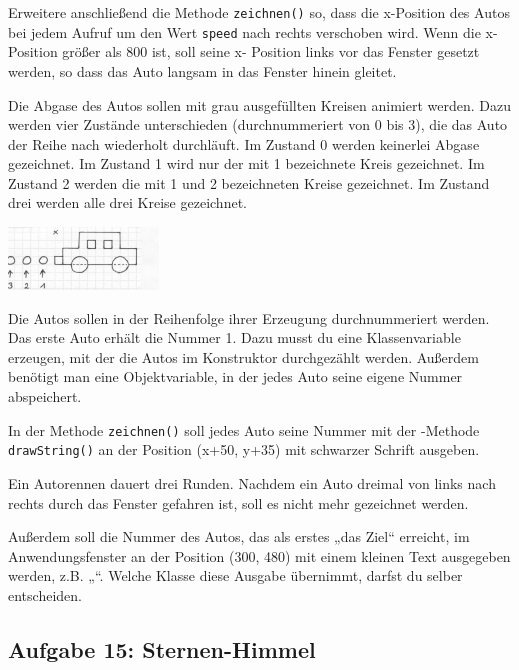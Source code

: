\begin{compactenum}[a)]
Erweitere anschließend die Methode \lstinline|zeichnen()| so, dass die
x-Position des Autos bei jedem Aufruf um den Wert \lstinline|speed| nach rechts
verschoben wird. Wenn die x-Position größer als 800 ist, soll seine x- Position
links vor das Fenster gesetzt werden, so dass das Auto langsam in das Fenster
hinein gleitet.

\item Die Abgase des Autos sollen mit grau ausgefüllten Kreisen animiert
werden. Dazu werden vier Zustände unterschieden (durchnummeriert von 0 bis 3),
die das Auto der Reihe nach wiederholt durchläuft. Im Zustand 0 werden
keinerlei Abgase gezeichnet. Im Zustand 1 wird nur der mit 1 bezeichnete Kreis
gezeichnet. Im Zustand 2 werden die mit 1 und 2 bezeichneten Kreise gezeichnet.
Im Zustand drei werden alle drei Kreise gezeichnet.

\begin{center}
\includegraphics[width=0.3\textwidth]{./inf/SEKII/10_Java_Klassen/autoMitAbgasen.jpg}
\end{center}

\item Die Autos sollen in der Reihenfolge ihrer Erzeugung durchnummeriert
werden. Das erste Auto erhält die Nummer 1. Dazu musst du eine Klassenvariable
erzeugen, mit der die Autos im Konstruktor durchgezählt werden. Außerdem
benötigt man eine Objektvariable, in der jedes Auto seine eigene Nummer
abspeichert.

In der Methode \lstinline|zeichnen()| soll jedes Auto seine Nummer mit der
-Methode \lstinline|drawString()| an der Position (x+50, y+35)
mit schwarzer Schrift ausgeben.

\item Ein Autorennen dauert drei Runden. Nachdem ein Auto dreimal von links nach
rechts durch das Fenster gefahren ist, soll es nicht mehr gezeichnet werden.

Außerdem soll die Nummer des Autos, das als erstes „das Ziel“ erreicht, im
Anwendungsfenster an der Position (300, 480) mit einem kleinen Text ausgegeben
werden, z.B. „“. Welche Klasse diese Ausgabe
übernimmt, darfst du selber entscheiden.
\end{compactenum}


\subsection{Aufgabe 15: Sternen-Himmel}

